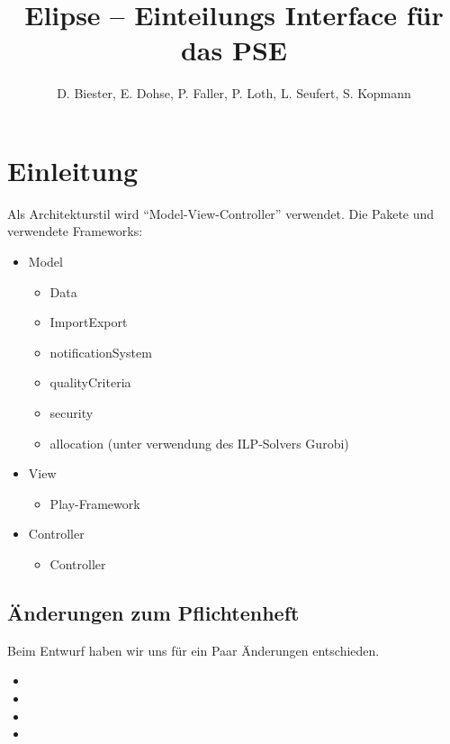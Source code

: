 \documentclass[parskip=full]{scrartcl}
\begin{document}
\title{Elipse -- Einteilungs Interface für das PSE}
\author{D. Biester, E. Dohse, P. Faller, P. Loth, L. Seufert, S. Kopmann}
\zweitgutachter{}

\mytitlepage

\tableofcontents
\pagebreak

\section{Einleitung}
Als Architekturstil wird \enquote{Model-View-Controller} verwendet.
Die Pakete und verwendete Frameworks:
\begin{itemize}
  \item Model
  \begin{itemize}
   \item Data 
  \item ImportExport
  \item notificationSystem
  \item qualityCriteria
  \item security
  \item allocation (unter verwendung des ILP-Solvers Gurobi)
   \end{itemize}
   \item View
   \begin{itemize}
    \item Play-Framework
   \end{itemize}
   \item Controller
   \begin{itemize}
    \item Controller
   \end{itemize}
\end{itemize}
\subsection{Änderungen zum Pflichtenheft}
Beim Entwurf haben wir uns für ein Paar Änderungen entschieden.
\begin{itemize}
  \item %
  \item %
  \item %
  \item %
\end{itemize}
\end{document}

